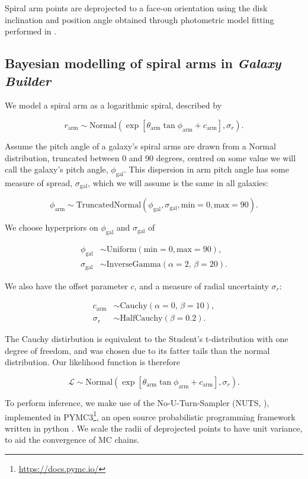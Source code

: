 Spiral arm points are deprojected to a face-on orientation using the disk inclination and position angle obtained through photometric model fitting performed in \Lingard.

\subsection{Bayesian modelling of spiral arms in \textit{Galaxy Builder}}

We model a spiral arm as a logarithmic spiral, described by

\begin{equation}
r_\mathrm{arm} \sim \mathrm{Normal}\left(\exp\left[\theta_\mathrm{arm}\tan\phi_\mathrm{arm} + c_\mathrm{arm}\right], \sigma_r\right).
\end{equation}

Assume the pitch angle of a galaxy's spiral arms are drawn from a Normal distribution, truncated between 0 and 90 degrees, centred on some value we will call the galaxy's pitch angle, $\phi_\mathrm{gal}$. This dispersion in arm pitch angle has some measure of spread, $\sigma_\mathrm{gal}$, which we will assume is the same in all galaxies:

\begin{equation}
\phi_\mathrm{arm} \sim \mathrm{TruncatedNormal}(\phi_\mathrm{gal}, \sigma_\mathrm{gal}, \mathrm{min}=0, \mathrm{max}=90).
\end{equation}

We choose hyperpriors on $\phi_\mathrm{gal}$ and $\sigma_\mathrm{gal}$ of

\begin{align}
  \phi_\mathrm{gal} &\sim \mathrm{Uniform}(\mathrm{min}=0, \mathrm{max}=90),\\
  \sigma_\mathrm{gal} &\sim \mathrm{InverseGamma}(\alpha=2,\,\beta=20).
\end{align}

We also have the offset parameter $c$, and a measure of radial uncertainty $\sigma_r$:

\begin{align}
  c_\mathrm{arm} &\sim \mathrm{Cauchy}(\alpha=0,\,\beta=10),\\
  \sigma_r &\sim \mathrm{HalfCauchy}(\beta=0.2).
\end{align}

The Cauchy distirbution is equivalent to the Student's t-distribution with one degree of freedom, and was chosen due to its fatter tails than the normal distribution. Our likelihood function is therefore

\begin{equation}
\mathcal{L} \sim \mathrm{Normal}\left(\exp\left[\theta_\mathrm{arm}\tan\phi_\mathrm{arm} + c_\mathrm{arm}\right], \sigma_r\right).
\end{equation}

To perform inference, we make use of the No-U-Turn-Sampler (NUTS, \citealt{2011arXiv1111.4246H}), implemented in PYMC3\footnote{\url{https://docs.pymc.io/}}, an open source probabilistic programming framework written in python \citep{pymc3_paper}. We scale the radii of deprojected points to have unit variance, to aid the convergence of MC chains.
